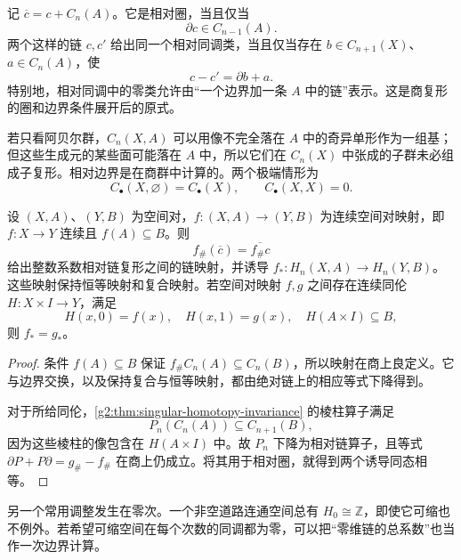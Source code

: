 记 \(\overline c=c+C_n(A)\)。它是相对圈，当且仅当
\[
	\partial c\in C_{n-1}(A).
\]
两个这样的链 \(c,c'\) 给出同一个相对同调类，当且仅当存在 \(b\in C_{n+1}(X)\)、\(a\in C_n(A)\)，使
\[
	c-c'=\partial b+a.
\]
特别地，相对同调中的零类允许由“一个边界加一条 \(A\) 中的链”表示。这是商复形的圈和边界条件展开后的原式。

若只看阿贝尔群，\(C_n(X,A)\) 可以用像不完全落在 \(A\) 中的奇异单形作为一组基；但这些生成元的某些面可能落在 \(A\) 中，所以它们在 \(C_n(X)\) 中张成的子群未必组成子复形。相对边界是在商群中计算的。两个极端情形为
\[
	C_\bullet(X,\varnothing)=C_\bullet(X),\qquad
	C_\bullet(X,X)=0.
\]

\begin{proposition}\label{g2:prop:relative-homotopy-invariance}
	设 \((X,A)\)、\((Y,B)\) 为空间对，\(f:(X,A)\to(Y,B)\) 为连续空间对映射，即 \(f:X\to Y\) 连续且 \(f(A)\subseteq B\)。则
	\[
		f_\#(\overline c)=\overline{f_\#c}
	\]
	给出整数系数相对链复形之间的链映射，并诱导 \(f_*:H_n(X,A)\to H_n(Y,B)\)。这些映射保持恒等映射和复合映射。若空间对映射 \(f,g\) 之间存在连续同伦 \(H:X\times I\to Y\)，满足
	\[
		H(x,0)=f(x),\quad H(x,1)=g(x),\quad H(A\times I)\subseteq B,
	\]
	则 \(f_*=g_*\)。
\end{proposition}
\begin{proof}
	条件 \(f(A)\subseteq B\) 保证 \(f_\#C_n(A)\subseteq C_n(B)\)，所以映射在商上良定义。它与边界交换，以及保持复合与恒等映射，都由绝对链上的相应等式下降得到。

	对于所给同伦，\cref{g2:thm:singular-homotopy-invariance} 的棱柱算子满足
	\[
		P_n(C_n(A))\subseteq C_{n+1}(B),
	\]
	因为这些棱柱的像包含在 \(H(A\times I)\) 中。故 \(P_n\) 下降为相对链算子，且等式 \(\partial P+P\partial=g_\#-f_\#\) 在商上仍成立。将其用于相对圈，就得到两个诱导同态相等。
\end{proof}

另一个常用调整发生在零次。一个非空道路连通空间总有 \(H_0\cong\mathbb Z\)，即使它可缩也不例外。若希望可缩空间在每个次数的同调都为零，可以把“零维链的总系数”也当作一次边界计算。

